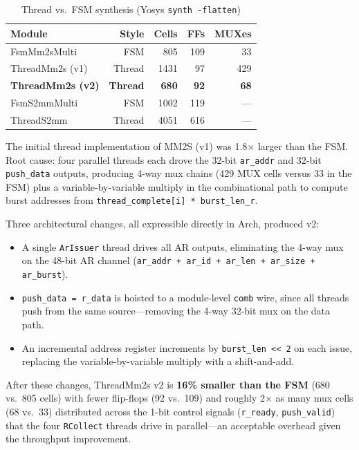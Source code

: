 \documentclass[11pt,twocolumn]{article}
\begin{document}
\begin{table}[t]
\centering
\caption{Thread vs.\ FSM synthesis (Yosys \texttt{synth -flatten})}
\label{tab:threadvsfsm}
\footnotesize
\setlength{\tabcolsep}{4pt}
\begin{tabular}{@{}lrrrr@{}}
\toprule
\textbf{Module} & \textbf{Style} & \textbf{Cells} & \textbf{FFs} & \textbf{MUXes} \\
\midrule
FsmMm2sMulti          & FSM          & 805  & 109 & 33  \\
ThreadMm2s (v1)       & Thread       & 1431 & 97  & 429 \\
\textbf{ThreadMm2s (v2)} & \textbf{Thread} & \textbf{680}  & \textbf{92}  & \textbf{68}  \\
\midrule
FsmS2mmMulti          & FSM          & 1002 & 119 & --- \\
ThreadS2mm            & Thread       & 4051 & 616 & --- \\
\bottomrule
\end{tabular}
\end{table}

The initial thread implementation of MM2S (v1) was 1.8$\times$ larger than the FSM. Root cause: four parallel threads each drove the 32-bit \texttt{ar\_addr} and 32-bit \texttt{push\_data} outputs, producing 4-way mux chains (429 MUX cells versus 33 in the FSM) plus a variable-by-variable multiply in the combinational path to compute burst addresses from \texttt{thread\_complete[i] * burst\_len\_r}.

Three architectural changes, all expressible directly in Arch, produced v2:

\begin{itemize}
\item A single \texttt{ArIssuer} thread drives all AR outputs, eliminating the 4-way mux on the 48-bit AR channel (\texttt{ar\_addr + ar\_id + ar\_len + ar\_size + ar\_burst}).
\item \texttt{push\_data = r\_data} is hoisted to a module-level \texttt{comb} wire, since all threads push from the same source---removing the 4-way 32-bit mux on the data path.
\item An incremental address register increments by \texttt{burst\_len << 2} on each issue, replacing the variable-by-variable multiply with a shift-and-add.
\end{itemize}

After these changes, ThreadMm2s v2 is \textbf{16\% smaller than the FSM} (680 vs.\ 805 cells) with fewer flip-flops (92 vs.\ 109) and roughly 2$\times$ as many mux cells (68 vs.\ 33) distributed across the 1-bit control signals (\texttt{r\_ready}, \texttt{push\_valid}) that the four \texttt{RCollect} threads drive in parallel---an acceptable overhead given the throughput improvement.
\end{document}
